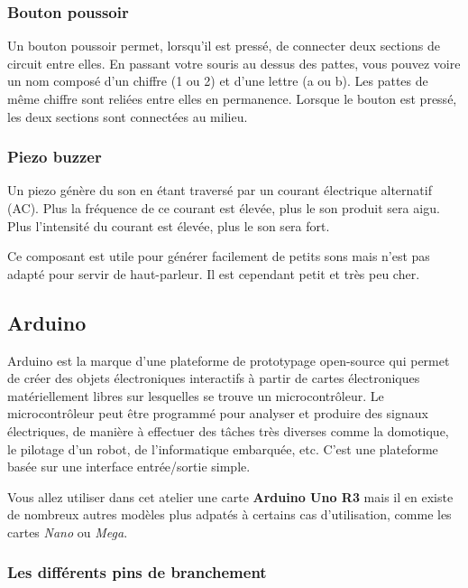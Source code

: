 \subsubsection{Bouton poussoir}

Un bouton poussoir permet, lorsqu'il est pressé, de connecter deux sections de circuit entre elles.
En passant votre souris au dessus des pattes, vous pouvez voire un nom composé d'un chiffre (1 ou 2) et d'une lettre (a ou b).
Les pattes de même chiffre sont reliées entre elles en permanence.
Lorsque le bouton est pressé, les deux sections sont connectées au milieu.


\subsubsection{Piezo buzzer}

Un piezo génère du son en étant traversé par un courant électrique alternatif (AC).
Plus la fréquence de ce courant est élevée, plus le son produit sera aigu.
Plus l'intensité du courant est élevée, plus le son sera fort.

Ce composant est utile pour générer facilement de petits sons mais n'est pas adapté pour servir de haut-parleur.
Il est cependant petit et très peu cher.



\clearpage
\subsection{Arduino}

Arduino est la marque d'une plateforme de prototypage open-source qui permet de créer des objets électroniques interactifs à partir de cartes électroniques matériellement libres sur lesquelles se trouve un microcontrôleur.
Le microcontrôleur peut être programmé pour analyser et produire des signaux électriques, de manière à effectuer des tâches très diverses comme la domotique, le pilotage d'un robot, de l'informatique embarquée, etc.
C'est une plateforme basée sur une interface entrée/sortie simple.

Vous allez utiliser dans cet atelier une carte \textbf{Arduino Uno R3} mais il en existe de nombreux autres modèles plus adpatés à certains cas d'utilisation, comme les cartes \textit{Nano} ou \textit{Mega}.

\subsubsection{Les différents pins de branchement}

